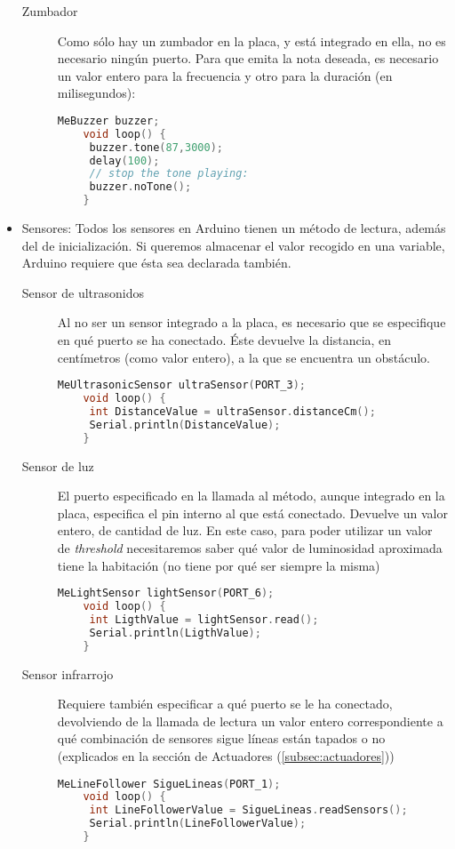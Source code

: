 \begin{itemize}
\begin{description}
	\item [Zumbador] Como sólo hay un zumbador en la placa, y está integrado en ella, no es necesario ningún puerto. Para que emita la nota deseada, es necesario un valor entero para la frecuencia y otro para la duración (en milisegundos):
	\begin{lstlisting}[language=C,caption={Uso del zumbador},captionpos=b]	
	MeBuzzer buzzer;
	void loop() {
	 buzzer.tone(87,3000);
	 delay(100);
	 // stop the tone playing:
	 buzzer.noTone();
	}
	\end{lstlisting}
\end{description}
\item Sensores: Todos los sensores en Arduino tienen un método de lectura, además del de inicialización. Si queremos almacenar el valor recogido en una variable, Arduino requiere que ésta sea declarada también.
\begin{description}
	\item [Sensor de ultrasonidos] Al no ser un sensor integrado a la placa, es necesario que se especifique en qué puerto se ha conectado. Éste devuelve la distancia, en centímetros (como valor entero), a la que se encuentra un obstáculo.
	\begin{lstlisting}[language=C,caption={Sensor de distancia},captionpos=b]	
	MeUltrasonicSensor ultraSensor(PORT_3);
	void loop() {
	 int DistanceValue = ultraSensor.distanceCm();
	 Serial.println(DistanceValue);
	}
	\end{lstlisting}
	\item [Sensor de luz] El puerto especificado en la llamada al método, aunque integrado en la placa, especifica el pin interno al que está conectado. Devuelve un valor entero, de cantidad de luz. En este caso, para poder utilizar un valor de \textit{threshold} necesitaremos saber qué valor de luminosidad aproximada tiene la habitación (no tiene por qué ser siempre la misma)
	\begin{lstlisting}[language=C,caption={Sensor de luz},captionpos=b]	
	MeLightSensor lightSensor(PORT_6);
	void loop() {
	 int LigthValue = lightSensor.read();
	 Serial.println(LigthValue);
	}
	\end{lstlisting}
	\item [Sensor infrarrojo] Requiere también especificar a qué puerto se le ha conectado, devolviendo de la llamada de lectura un valor entero correspondiente a qué combinación de sensores sigue líneas están tapados o no (explicados en la sección de Actuadores (\ref{subsec:actuadores}))
	\begin{lstlisting}[language=C,caption={Sensor siguelíneas},captionpos=b]	
	MeLineFollower SigueLineas(PORT_1); 
	void loop() {
	 int LineFollowerValue = SigueLineas.readSensors();
	 Serial.println(LineFollowerValue);
	}
	\end{lstlisting}
\end{description}
\end{itemize}

